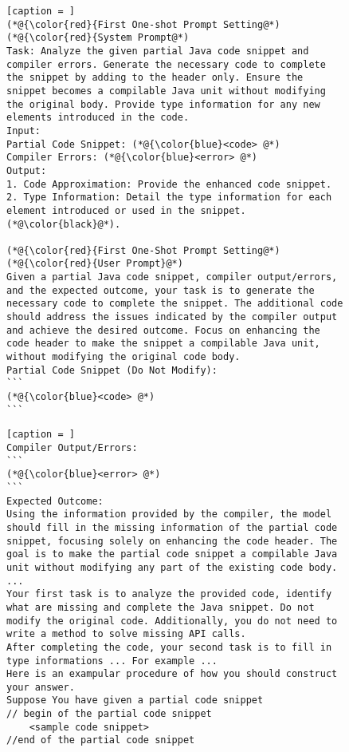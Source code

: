 \begin{figure}[t]
	\centering
\begin{minipage}{.5\textwidth}        
\begin{lstlisting}[caption = ]
(*@{\color{red}{First One-shot Prompt Setting@*)
(*@{\color{red}{System Prompt@*)
Task: Analyze the given partial Java code snippet and compiler errors. Generate the necessary code to complete the snippet by adding to the header only. Ensure the snippet becomes a compilable Java unit without modifying the original body. Provide type information for any new elements introduced in the code.
Input:
Partial Code Snippet: (*@{\color{blue}<code> @*)
Compiler Errors: (*@{\color{blue}<error> @*)
Output:
1. Code Approximation: Provide the enhanced code snippet.
2. Type Information: Detail the type information for each element introduced or used in the snippet.(*@\color{black}@*).

(*@{\color{red}{First One-Shot Prompt Setting@*)
(*@{\color{red}{User Prompt}@*)
Given a partial Java code snippet, compiler output/errors, and the expected outcome, your task is to generate the necessary code to complete the snippet. The additional code should address the issues indicated by the compiler output and achieve the desired outcome. Focus on enhancing the code header to make the snippet a compilable Java unit, without modifying the original code body.
Partial Code Snippet (Do Not Modify):
```
(*@{\color{blue}<code> @*)
```
\end{lstlisting}
\end{minipage}
\begin{minipage}{.5\textwidth}        
  \begin{lstlisting}[caption = ]
Compiler Output/Errors:
```
(*@{\color{blue}<error> @*)
```
Expected Outcome:
Using the information provided by the compiler, the model should fill in the missing information of the partial code snippet, focusing solely on enhancing the code header. The goal is to make the partial code snippet a compilable Java unit without modifying any part of the existing code body. ...
Your first task is to analyze the provided code, identify what are missing and complete the Java snippet. Do not modify the original code. Additionally, you do not need to write a method to solve missing API calls.
After completing the code, your second task is to fill in type informations ... For example ...
Here is an exampular procedure of how you should construct your answer.
Suppose You have given a partial code snippet
// begin of the partial code snippet
    <sample code snippet>
//end of the partial code snippet


\end{lstlisting}
\end{minipage}
\end{figure}
